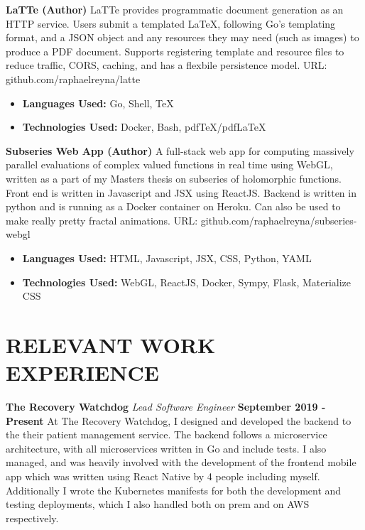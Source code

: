 \documentclass[margin]{./res}
\begin{document}
\begin{resume}
{\bf LaTTe (Author)}\newline
LaTTe provides programmatic document generation as an HTTP service.
Users submit a templated LaTeX, following Go's templating format, and a JSON object and any resources they may need (such as images) to produce
a PDF document. Supports registering template and resource files to reduce traffic, CORS, caching, and has a flexbile persistence model.
URL: github.com/raphaelreyna/latte
\begin{multicols}{2}
\begin{itemize}
\item {\bf Languages Used: }\newline Go, Shell, TeX
  \columnbreak
\item {\bf Technologies Used: }\newline Docker, Bash, pdfTeX/pdfLaTeX
\end{itemize}
\end{multicols}

{\bf Subseries Web App (Author)}\newline
A full-stack web app for computing massively parallel evaluations of complex
valued functions in real time using WebGL, written as a part of my Masters thesis on subseries of holomorphic functions.
Front end is written in Javascript and JSX using ReactJS.
Backend is written in python and is running as a Docker container on Heroku.
Can also be used to make really pretty fractal animations.
URL: github.com/raphaelreyna/subseries-webgl
\begin{multicols}{2}
\begin{itemize}
\item {\bf Languages Used: }\newline HTML, Javascript, JSX, CSS, Python, YAML
  \columnbreak
\item {\bf Technologies Used: }\newline WebGL, ReactJS,
  Docker, Sympy, Flask, Materialize CSS
\end{itemize}
\end{multicols}

\section{RELEVANT WORK EXPERIENCE}
{\bf The Recovery Watchdog}\newline
{\it Lead Software Engineer}\newline
{\bf September 2019 - Present}\newline
At The Recovery Watchdog, I designed and developed the backend to the their patient management service.
The backend follows a microservice architecture, with all microservices written in Go and include tests.
I also managed, and was heavily involved with the development of the frontend mobile app which was written using React Native by 4 people including myself.
Additionally I wrote the Kubernetes manifests for both the development and testing deployments, which I also handled both on prem and on AWS respectively.


\end{resume}
\end{document}

